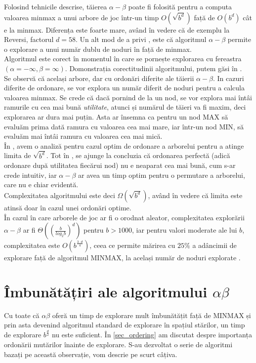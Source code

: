 \documentclass[12pt,twoside,a4paper,fleqn]{book}
\theoremstyle{definition}
\begin{document}
Folosind tehnicile descrise, tăierea $\alpha - \beta$ poate fi folosită pentru a computa valoarea minmax a unui arbore de joc într-un timp $O(\sqrt{b^{d}})$ față de $O(b^{d})$ cât e la minmax. Diferența este foarte mare, având în vedere că de exemplu la Reversi, factorul $d = 58$. Un alt mod de a privi \cite{mcAllstar}, este că algoritmul $\alpha - \beta$ permite o explorare a unui număr dublu de noduri în față de minmax.\\
Algoritmul este corect în momentul în care se pornește explorarea cu fereastra $(\alpha = -\infty, \beta = \infty)$. 
Domonstrația corectitudinii algoritmului, putem găsi în \cite{giumale, mcallstar, sheng_hsu}.\\
Se observă că același arbore, dar cu ordonări diferite ale tăierii $\alpha - \beta$. In cazuri diferite de ordonare, se vor explora un număr diferit de noduri pentru a calcula valoarea minmax. Se crede că dacă pornind de la un nod, se vor explora mai întâi ramurile cu cea mai bună \emph{utilitate}, atunci și numărul de tăieri va fi maxim, deci explorarea ar dura mai puțin. Asta ar însemna ca pentru un nod MAX să evaluăm prima dată ramura cu valoarea cea mai mare, iar într-un nod MIN, să evaluăm mai întâi ramura cu valoarea cea mai mică.\\
În \cite{sheng_hsu}, avem o analiză pentru cazul optim de ordonare a arborelui pentru a atinge limita de $\sqrt{b^{d}}$. Tot în \cite{sheng_hsu}, se ajunge la concluzia că ordonarea perfectă (adică ordonare după utilitatea fiecărui nod) nu e neaparat cea mai bună, cum s-ar crede intuitiv, iar $\alpha - \beta$ ar avea un timp optim pentru o permutare a arborelui, care nu e chiar evidentă.\\
Complexitatea algoritmului este deci $\Omega(\sqrt{b^{d}})$, având în vedere că limita este atinsă doar în cazul unei ordonări optime.\\
În cazul în care arborele de joc ar fi o orodnat aleator, complexitatea explorării $\alpha - \beta$ ar fi 
$\Theta((\frac{b}{log_{2}b})^{d})$ pentru $b > 1000$, iar pentru valori moderate ale lui $b$, complexitatea este $O(b^{\frac{3 \cdot d}{4}})$, ceea ce permite mărirea cu $25\%$ a adâncimii de explorare față de algoritmul MINMAX, la același număr de noduri explorate \cite{giumale}.
\label{sec_ordering}

\section{Îmbunătățiri ale algoritmului $\alpha \beta$}
Cu toate că $\alpha \beta$ oferă un timp de explorare mult îmbunătățit față de MINMAX și prin asta devenind algoritmul standard de explorare în spațiul stărilor, un timp de explorare $b^{\frac{d}{2}}$ nu este suficient. În \ref{sec_ordering} am discutat despre importanța ordonării mutărilor înainte de explorare. S-au dezvoltat o serie de algoritmi bazați pe această observație, vom descrie pe scurt câțiva.
\end{document}
